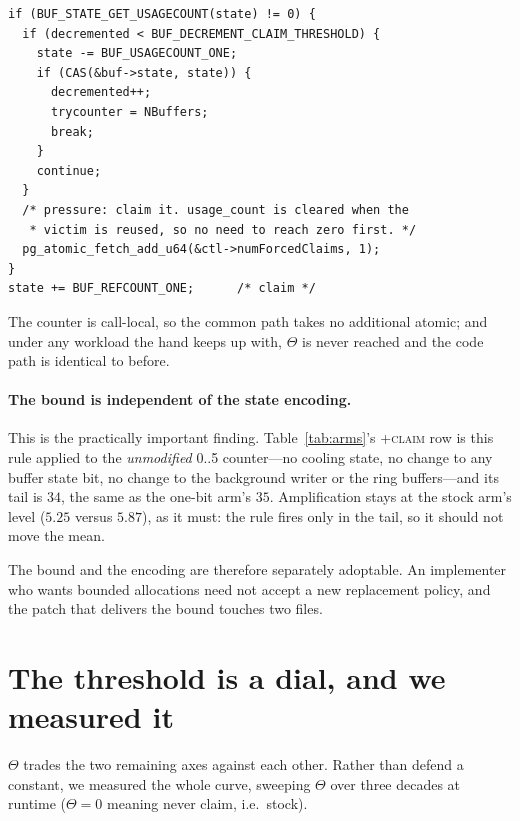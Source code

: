 \documentclass[sigconf,nonacm]{acmart}
\begin{document}
\begin{lstlisting}
if (BUF_STATE_GET_USAGECOUNT(state) != 0) {
  if (decremented < BUF_DECREMENT_CLAIM_THRESHOLD) {
    state -= BUF_USAGECOUNT_ONE;
    if (CAS(&buf->state, state)) {
      decremented++;
      trycounter = NBuffers;
      break;
    }
    continue;
  }
  /* pressure: claim it. usage_count is cleared when the
   * victim is reused, so no need to reach zero first. */
  pg_atomic_fetch_add_u64(&ctl->numForcedClaims, 1);
}
state += BUF_REFCOUNT_ONE;      /* claim */
\end{lstlisting}

The counter is call-local, so the common path takes no additional atomic; and
under any workload the hand keeps up with, $\Theta$ is never reached and the
code path is identical to before.

\paragraph{The bound is independent of the state encoding.} This is the
practically important finding. Table~\ref{tab:arms}'s \textsc{+claim} row is
this rule applied to the \emph{unmodified} 0..5 counter---no cooling state, no
change to any buffer state bit, no change to the background writer or the ring
buffers---and its tail is $34$, the same as the one-bit arm's $35$. Amplification
stays at the stock arm's level ($5.25$ versus $5.87$), as it must: the rule
fires only in the tail, so it should not move the mean.

The bound and the encoding are therefore separately adoptable. An implementer
who wants bounded allocations need not accept a new replacement policy, and the
patch that delivers the bound touches two files.

\section{The threshold is a dial, and we measured it}
\label{sec:theta}

$\Theta$ trades the two remaining axes against each other. Rather than defend a
constant, we measured the whole curve, sweeping $\Theta$ over three decades at
runtime ($\Theta=0$ meaning never claim, i.e.\ stock).
\end{document}
